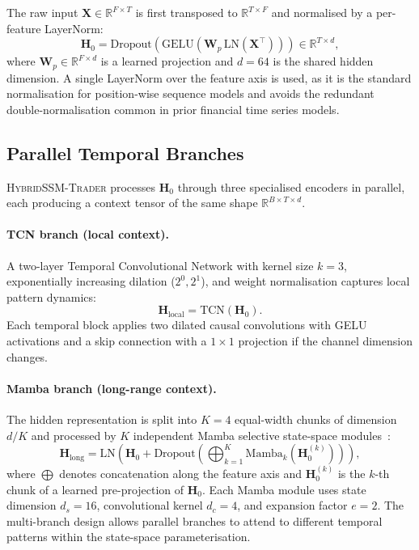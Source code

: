 \documentclass[runningheads]{llncs}
\begin{document}
The raw input $\mathbf{X} \in \mathbb{R}^{F \times T}$ is first transposed to
$\mathbb{R}^{T \times F}$ and normalised by a per-feature LayerNorm:
\begin{equation}
  \mathbf{H}_0 = \text{Dropout}\!\left(
    \text{GELU}\!\left(
      \mathbf{W}_p\, \text{LN}(\mathbf{X}^\top)
    \right)
  \right) \in \mathbb{R}^{T \times d},
  \label{eq:preprocess}
\end{equation}
where $\mathbf{W}_p \in \mathbb{R}^{F \times d}$ is a learned projection and
$d = 64$ is the shared hidden dimension.  A single LayerNorm over the feature
axis is used, as it is the standard normalisation for position-wise sequence
models and avoids the redundant double-normalisation common in prior
financial time series models.

\subsection{Parallel Temporal Branches}
\label{sec:branches}

\textsc{HybridSSM-Trader} processes $\mathbf{H}_0$ through three specialised
encoders in parallel, each producing a context tensor of the same shape
$\mathbb{R}^{B \times T \times d}$.

\paragraph{TCN branch (local context).}
A two-layer Temporal Convolutional Network with kernel size $k=3$, exponentially
increasing dilation ($2^0, 2^1$), and weight normalisation captures local
pattern dynamics:
\begin{equation}
  \mathbf{H}_{\text{local}} = \text{TCN}(\mathbf{H}_0).
  \label{eq:tcn}
\end{equation}
Each temporal block applies two dilated causal convolutions with GELU activations
and a skip connection with a $1{\times}1$ projection if the channel dimension changes.

\paragraph{Mamba branch (long-range context).}
The hidden representation is split into $K=4$ equal-width chunks of dimension
$d/K$ and processed by $K$ independent Mamba selective state-space
modules~\cite{gu2023mamba}:
\begin{equation}
  \mathbf{H}_{\text{long}} = \text{LN}\!\left(
    \mathbf{H}_0 +
    \text{Dropout}\!\left(
      \bigoplus_{k=1}^{K} \text{Mamba}_k\!\left(\mathbf{H}_0^{(k)}\right)
    \right)
  \right),
  \label{eq:mamba}
\end{equation}
where $\bigoplus$ denotes concatenation along the feature axis and
$\mathbf{H}_0^{(k)}$ is the $k$-th chunk of a learned pre-projection of
$\mathbf{H}_0$.  Each Mamba module uses state dimension $d_s{=}16$,
convolutional kernel $d_c{=}4$, and expansion factor $e{=}2$.
The multi-branch design allows parallel branches to attend to different
temporal patterns within the state-space parameterisation.
\end{document}

